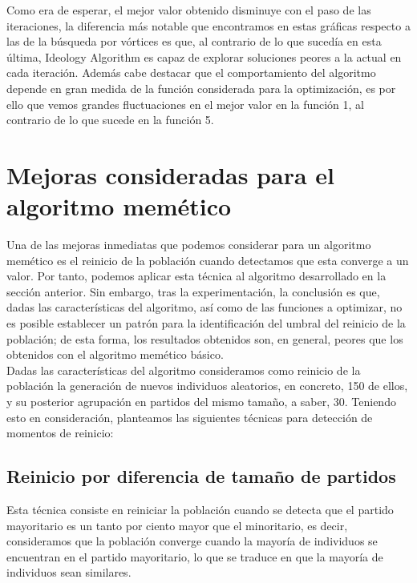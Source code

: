 \documentclass[11pt,a4paper]{article}
\begin{document}
	\noindent Como era de esperar, el mejor valor obtenido disminuye con el paso de las iteraciones, la diferencia más notable que encontramos en estas gráficas respecto a las de la búsqueda por vórtices es que, al contrario de lo que sucedía en esta última, Ideology Algorithm es capaz de explorar soluciones peores a la actual en cada iteración. Además cabe destacar que el comportamiento del algoritmo depende en gran medida de la función considerada para la optimización, es por ello que vemos grandes fluctuaciones en el mejor valor en la función 1, al contrario de lo que sucede en la función 5.
	
\clearpage
	
\section{Mejoras consideradas para el algoritmo memético}

	\noindent Una de las mejoras inmediatas que podemos considerar para un algoritmo memético es el reinicio de la población cuando detectamos que esta converge a un valor. Por tanto, podemos aplicar esta técnica al algoritmo desarrollado en la sección anterior. Sin embargo, tras la experimentación, la conclusión es que, dadas las características del algoritmo, así como de las funciones a optimizar, no es posible establecer un patrón para la identificación del umbral del reinicio de la población; de esta forma, los resultados obtenidos son, en general, peores que los obtenidos con el algoritmo memético básico.\\
	
	\noindent Dadas las características del algoritmo consideramos como reinicio de la población la generación de nuevos individuos aleatorios, en concreto, 150 de ellos, y su posterior agrupación en partidos del mismo tamaño, a saber, 30. Teniendo esto en consideración, planteamos las siguientes técnicas para detección de momentos de reinicio:
	
	\subsection{Reinicio por diferencia de tamaño de partidos}
	
		\noindent Esta técnica consiste en reiniciar la población cuando se detecta que el partido mayoritario es un tanto por ciento mayor que el minoritario, es decir, consideramos que la población converge cuando la mayoría de individuos se encuentran en el partido mayoritario, lo que se traduce en que la mayoría de individuos sean similares.\\
		
\end{document}
